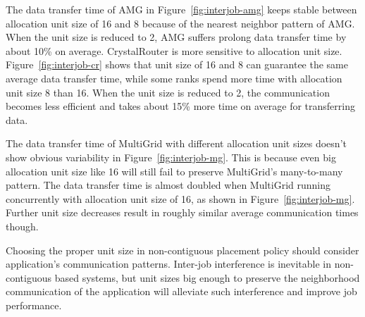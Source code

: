 The data transfer time of AMG in Figure~\ref{fig:interjob-amg} keeps stable 
between allocation unit size of 16 and 8 because of the 
nearest neighbor pattern of AMG. 
When the unit size is reduced to 2, AMG suffers prolong data transfer time by about 10\% on average. 
CrystalRouter is more sensitive to allocation unit size. 
Figure~\ref{fig:interjob-cr} shows that unit size of 16 and 8 can guarantee 
the same average data transfer time, 
while some ranks spend more time with allocation unit size 8 than 16. 
When the unit size is reduced to 2, the communication becomes less efficient 
and takes about 15\% more time on average for transferring data. 

The data transfer time of MultiGrid with different allocation unit sizes 
doesn't show obvious variability in Figure~\ref{fig:interjob-mg}. 
This is because even big allocation unit size like 16 will still fail to preserve MultiGrid's many-to-many pattern. 
The data transfer time is almost doubled when MultiGrid running concurrently with allocation unit size of 16, 
as shown in Figure~\ref{fig:interjob-mg}. 
Further unit size decreases result in roughly similar average communication times though.

Choosing the proper unit size in non-contiguous placement policy should 
consider application's communication patterns. 
Inter-job interference is inevitable in non-contiguous based systems, 
but unit sizes big enough to preserve the neighborhood communication of the application 
will alleviate such interference and improve job performance. 



